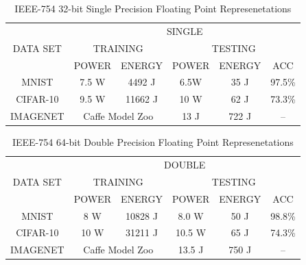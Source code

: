 \documentclass[letterpaper, 10 pt, conference]{ieeeconf}
\begin{document}
\begin{table}[ht]
  \centering
  \caption{IEEE-754 32-bit Single Precision Floating Point Represenetations}
  \label{my-label}
  \begin{tabular}{|c|c|c|c|c|c|}
    \hline
    \multirow{3}{*}{DATA SET} & \multicolumn{5}{c|}{SINGLE}                                                     \\ \cline{2-6} 
                              & \multicolumn{2}{c|}{TRAINING}                    & \multicolumn{3}{c|}{TESTING} \\ \cline{2-6} 
                              & POWER                  & ENERGY                  & POWER  & ENERGY  & ACC  \\ \hline
    MNIST                     & 7.5 W                  & 4492 J                  & 6.5W   & 35 J    & 97.5\%    \\ \hline
    CIFAR-10                  & 9.5 W                  & 11662 J                 & 10 W    & 62 J    & 73.3\%    \\ \hline
    IMAGENET                  & \multicolumn{2}{c|}{Caffe Model Zoo}             & 13 J   & 722 J   & --        \\ \hline
  \end{tabular}
\end{table}

\begin{table}[ht]
  \centering
  \caption{IEEE-754 64-bit Double Precision Floating Point Represenetations}
  \label{my-label}
  \begin{tabular}{|c|c|c|c|c|c|}
    \hline
    \multirow{3}{*}{DATA SET} & \multicolumn{5}{c|}{DOUBLE}                                                     \\ \cline{2-6} 
                              & \multicolumn{2}{c|}{TRAINING}                    & \multicolumn{3}{c|}{TESTING} \\ \cline{2-6} 
                              & POWER                  & ENERGY                  & POWER  & ENERGY  & ACC  \\ \hline
    MNIST                     & 8 W                    & 10828 J                 & 8.0 W  & 50 J    & 98.8\%    \\ \hline
    CIFAR-10                  & 10 W                   & 31211 J                 & 10.5 W & 65 J    & 74.3\%    \\ \hline
    IMAGENET                  & \multicolumn{2}{c|}{Caffe Model Zoo}             & 13.5 J & 750 J   & --        \\ \hline
  \end{tabular}
\end{table}
\end{document}
